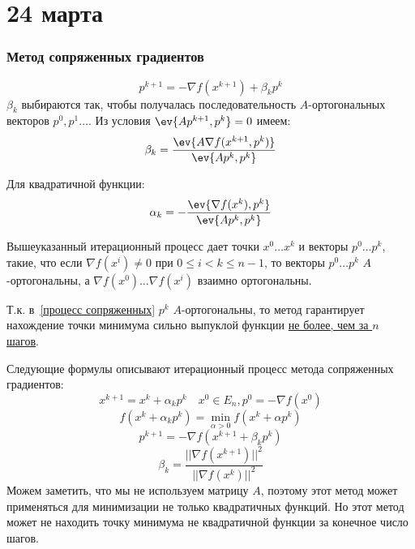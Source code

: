 \chapter{24 марта}

\subsection{Метод сопряженных градиентов}

\begin{equation}
    p^{k + 1} = - \nabla f (x^{k + 1}) + \beta_k p^k
    \label{процесс сопряженных}
\end{equation}
\(\beta_k\) выбираются так, чтобы получалась последовательность \(A\)-ортогональных векторов \(p^0, p^1 \dots \). Из условия \(\ev{A p^{k + 1}, p^k} = 0\) имеем:
\begin{equation}
    \beta_k = \frac{\ev{A \nabla f(x^{k + 1}, p^k)}}{\ev{A p^k, p^k}}
    \label{beta}
\end{equation}

Для квадратичной функции:
\begin{equation}
    \alpha_k = -\frac{\ev{\nabla f(x^k), p^k}}{\ev{A p^k, p^k}}
    \label{alpha}
\end{equation}

Вышеуказанный итерационный процесс дает точки \(x^0 \dots x^k\) и векторы \(p^0 \dots p^k\), такие, что если \(\nabla f(x^i) \neq 0\) при \(0 \leq i < k \leq n - 1\), то векторы \(p^0 \dots p^k\) \(A\)-ортогональны, а \(\nabla f(x^0) \dots \nabla f(x^i)\) взаимно ортогональны.

Т.к. в~\eqref{процесс сопряженных} \(p^k\) \(A\)-ортогональны, то метод гарантирует нахождение точки минимума сильно выпуклой функции \underline{не более, чем за \(n\) шагов}.

Следующие формулы описывают итерационный процесс метода сопряженных градиентов:
\begin{equation}
    x^{k + 1} = x^k + \alpha_k p^k \quad x^0 \in E_n, p^0 = -\nabla f(x^0)
\end{equation}
\begin{equation}
    f(x^k + \alpha_k p^k) = \min_{\alpha > 0} f(x^k + \alpha p^k)
\end{equation}
\begin{equation}
    p^{k + 1} = - \nabla f(x^{k + 1} + \beta_k p^k)
\end{equation}
\begin{equation}
    \beta_k = \frac{||\nabla f(x^{k + 1})||^2}{||\nabla f(x^k)||^2}
\end{equation}
Можем заметить, что мы не используем матрицу \(A\), поэтому этот метод может применяться для минимизации не только квадратичных функций. Но этот метод может не находить точку минимума не квадратичной функции за конечное число шагов.

